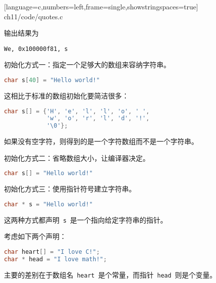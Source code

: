\begin{frame}[fragile]

[language=c,numbers=left,frame=single,showstringspaces=true]
{ch11/code/quotes.c}
\pause \vspace{0.1in}

输出结果为
\begin{lstlisting}[basicstyle=\ttfamily,showspaces=true]
We, 0x100000f81, s
\end{lstlisting}
\end{frame}

\begin{frame}[fragile]
初始化方式一：指定一个足够大的数组来容纳字符串。
\begin{lstlisting}[language=c]
char s[40] = "Hello world!"
\end{lstlisting} \pause \vspace{0.1in}

这相比于标准的数组初始化要简洁很多：
\begin{lstlisting}[language=c]
char s[] = {'H', 'e', 'l', 'l', 'o', ' ', 
            'w', 'o', 'r', 'l', 'd', '!', 
            '\0'};
\end{lstlisting}
如果没有空字符，则得到的是一个字符数组而不是一个字符串。
\end{frame}

\begin{frame}[fragile]
\end{frame}

\begin{frame}[fragile]
初始化方式二：省略数组大小，让编译器决定。
\begin{lstlisting}[language=c,showstringspaces=true]
char s[] = "Hello world!"
\end{lstlisting} \pause \vspace{0.1in}

初始化方式三：使用指针符号建立字符串。
\begin{lstlisting}[language=c,showstringspaces=true]
char * s = "Hello world!"
\end{lstlisting} \pause \vspace{0.1in}

这两种方式都声明\lstinline| s |是一个指向给定字符串的指针。
\end{frame}

\begin{frame}[fragile]
考虑如下两个声明：
\begin{lstlisting}[language=c,showstringspaces=true]
char heart[] = "I love C!";
char * head = "I love math!";
\end{lstlisting}
\vspace{0.1in}

主要的差别在于数组名\lstinline| heart |是个常量，而指针\lstinline| head |则是个变量。
\end{frame}

